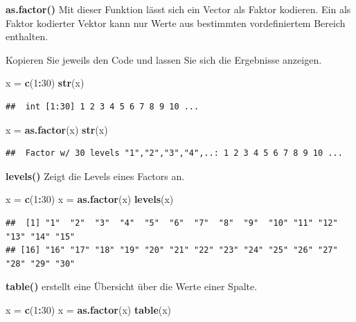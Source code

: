 \documentclass[]{book}
\newenvironment{Shaded}{\begin{snugshade}}{\end{snugshade}}
\newcommand{\KeywordTok}[1]{\textcolor[rgb]{0.13,0.29,0.53}{\textbf{#1}}}
\newcommand{\DecValTok}[1]{\textcolor[rgb]{0.00,0.00,0.81}{#1}}
\newcommand{\StringTok}[1]{\textcolor[rgb]{0.31,0.60,0.02}{#1}}
\newcommand{\OperatorTok}[1]{\textcolor[rgb]{0.81,0.36,0.00}{\textbf{#1}}}
\newcommand{\NormalTok}[1]{#1}
\begin{document}
\textbf{as.factor()} Mit dieser Funktion lässt sich ein Vector als
Faktor kodieren. Ein als Faktor kodierter Vektor kann nur Werte aus
bestimmten vordefiniertem Bereich enthalten.

Kopieren Sie jeweils den Code und lassen Sie sich die Ergebnisse
anzeigen.

\begin{Shaded}
\begin{Highlighting}[]
\NormalTok{x =}\StringTok{ }\KeywordTok{c}\NormalTok{(}\DecValTok{1}\OperatorTok{:}\DecValTok{30}\NormalTok{)}
\KeywordTok{str}\NormalTok{(x)}
\end{Highlighting}
\end{Shaded}

\begin{verbatim}
##  int [1:30] 1 2 3 4 5 6 7 8 9 10 ...
\end{verbatim}

\begin{Shaded}
\begin{Highlighting}[]
\NormalTok{x =}\StringTok{ }\KeywordTok{as.factor}\NormalTok{(x)}
\KeywordTok{str}\NormalTok{(x)}
\end{Highlighting}
\end{Shaded}

\begin{verbatim}
##  Factor w/ 30 levels "1","2","3","4",..: 1 2 3 4 5 6 7 8 9 10 ...
\end{verbatim}

\textbf{levels()} Zeigt die Levels eines Factors an.

\begin{Shaded}
\begin{Highlighting}[]
\NormalTok{x =}\StringTok{ }\KeywordTok{c}\NormalTok{(}\DecValTok{1}\OperatorTok{:}\DecValTok{30}\NormalTok{)}
\NormalTok{x =}\StringTok{ }\KeywordTok{as.factor}\NormalTok{(x)}
\KeywordTok{levels}\NormalTok{(x)}
\end{Highlighting}
\end{Shaded}

\begin{verbatim}
##  [1] "1"  "2"  "3"  "4"  "5"  "6"  "7"  "8"  "9"  "10" "11" "12" "13" "14" "15"
## [16] "16" "17" "18" "19" "20" "21" "22" "23" "24" "25" "26" "27" "28" "29" "30"
\end{verbatim}

\textbf{table()} erstellt eine Übersicht über die Werte einer Spalte.

\begin{Shaded}
\begin{Highlighting}[]
\NormalTok{x =}\StringTok{ }\KeywordTok{c}\NormalTok{(}\DecValTok{1}\OperatorTok{:}\DecValTok{30}\NormalTok{)}
\NormalTok{x =}\StringTok{ }\KeywordTok{as.factor}\NormalTok{(x)}
\KeywordTok{table}\NormalTok{(x)}
\end{Highlighting}
\end{Shaded}
\end{document}
